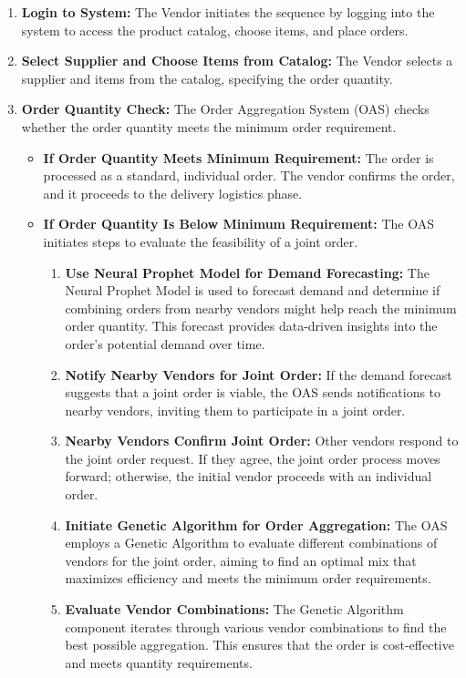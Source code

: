 \begin{enumerate}
    \item \textbf{Login to System:} The Vendor initiates the sequence by logging into the system to access the product catalog, choose items, and place orders.
    \item \textbf{Select Supplier and Choose Items from Catalog:} The Vendor selects a supplier and items from the catalog, specifying the order quantity.
    \item \textbf{Order Quantity Check:} The Order Aggregation System (OAS) checks whether the order quantity meets the minimum order requirement.
    \begin{itemize}
        \item \textbf{If Order Quantity Meets Minimum Requirement:} The order is processed as a standard, individual order. The vendor confirms the order, and it proceeds to the delivery logistics phase.
        \item \textbf{If Order Quantity Is Below Minimum Requirement:} The OAS initiates steps to evaluate the feasibility of a joint order.
        \begin{enumerate}
            \item \textbf{Use Neural Prophet Model for Demand Forecasting:} The Neural Prophet Model is used to forecast demand and determine if combining orders from nearby vendors might help reach the minimum order quantity. This forecast provides data-driven insights into the order’s potential demand over time.
            \item \textbf{Notify Nearby Vendors for Joint Order:} If the demand forecast suggests that a joint order is viable, the OAS sends notifications to nearby vendors, inviting them to participate in a joint order.
            \item \textbf{Nearby Vendors Confirm Joint Order:} Other vendors respond to the joint order request. If they agree, the joint order process moves forward; otherwise, the initial vendor proceeds with an individual order.
            \item \textbf{Initiate Genetic Algorithm for Order Aggregation:} The OAS employs a Genetic Algorithm to evaluate different combinations of vendors for the joint order, aiming to find an optimal mix that maximizes efficiency and meets the minimum order requirements.
            \item \textbf{Evaluate Vendor Combinations:} The Genetic Algorithm component iterates through various vendor combinations to find the best possible aggregation. This ensures that the order is cost-effective and meets quantity requirements.

\end{enumerate}
\end{itemize}
\end{enumerate}
